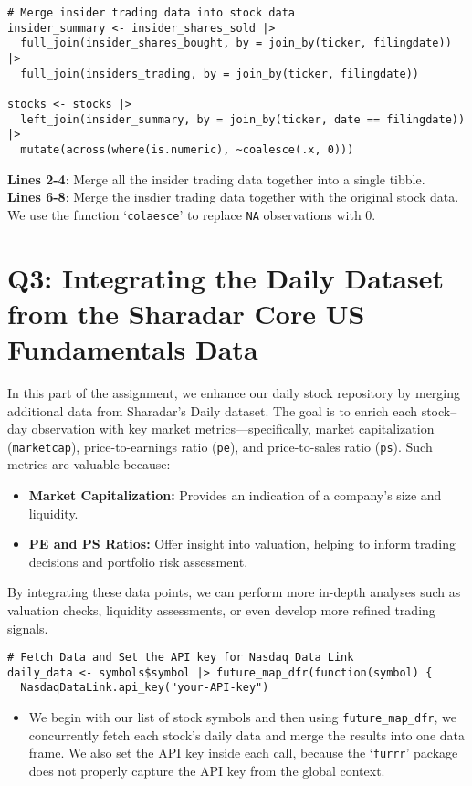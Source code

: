 \documentclass[12pt,letterpaper]{article}
\begin{document}
\begin{verbatim}
# Merge insider trading data into stock data
insider_summary <- insider_shares_sold |>
  full_join(insider_shares_bought, by = join_by(ticker, filingdate)) |>
  full_join(insiders_trading, by = join_by(ticker, filingdate))

stocks <- stocks |>
  left_join(insider_summary, by = join_by(ticker, date == filingdate)) |>
  mutate(across(where(is.numeric), ~coalesce(.x, 0)))
\end{verbatim}
\textbf{Lines 2-4}: Merge all the insider trading data together into a single tibble.\\
\textbf{Lines 6-8}: Merge the insdier trading data together with the original stock data. We use the function `\texttt{colaesce}' to replace \texttt{NA} observations with 0.

\section{Q3: Integrating the Daily Dataset from the Sharadar Core US Fundamentals Data}

In this part of the assignment, we enhance our daily stock repository by
merging additional data from Sharadar’s Daily dataset. The goal is to enrich
each stock–day observation with key market metrics—specifically, market
capitalization (\texttt{marketcap}), price-to-earnings ratio (\texttt{pe}), and
price-to-sales ratio (\texttt{ps}). Such metrics are valuable because:

\begin{itemize}
  \item \textbf{Market Capitalization:} Provides an indication of a company’s size and liquidity.
  \item \textbf{PE and PS Ratios:} Offer insight into valuation, helping to inform trading decisions and portfolio risk assessment.
\end{itemize}

By integrating these data points, we can perform more in-depth analyses such as valuation checks, liquidity assessments, or even develop more refined trading signals.

\begin{verbatim}
# Fetch Data and Set the API key for Nasdaq Data Link
daily_data <- symbols$symbol |> future_map_dfr(function(symbol) {
  NasdaqDataLink.api_key("your-API-key")
\end{verbatim}
\begin{itemize}
  \item We begin with our list of stock symbols and then using \verb|future_map_dfr|, we concurrently fetch each stock’s daily data and merge the results into one data frame. We also set the API key inside each call, because the `\texttt{furrr}' package does not properly capture the API key from the global context.
\end{itemize}
\end{document}
